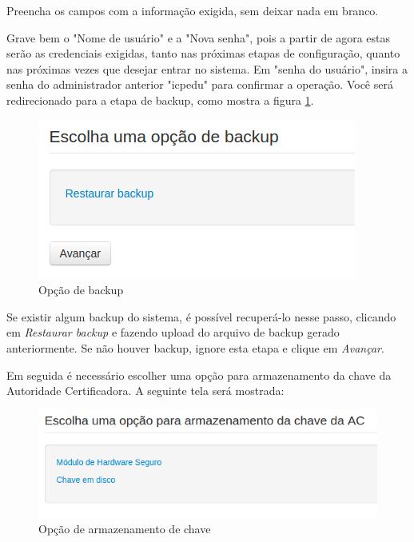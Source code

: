     Preencha os campos com a informação exigida, sem deixar nada em branco. 
    
    Grave bem o "Nome de usuário" e a "Nova senha", pois a partir de agora estas serão as credenciais exigidas, tanto nas próximas etapas de configuração, quanto nas próximas vezes que desejar entrar no sistema. Em "senha do usuário", insira a senha do administrador anterior "icpedu" para confirmar a operação. Você será redirecionado para a etapa de backup, como mostra a figura \ref{fig:opcaobackup}.
    
    \begin{figure}[ht]
     \centering
     \includegraphics[scale=0.6]{images/opcaobackup.png}
     \caption{Opção de backup}
     \label{fig:opcaobackup}
\end{figure}

    Se existir algum backup do sistema, é possível recuperá-lo nesse passo, clicando em \textit{Restaurar backup} e fazendo upload do arquivo de backup gerado anteriormente. Se não houver backup, ignore esta etapa e clique em \textit{Avançar}. 
    
    Em seguida é necessário escolher uma opção para armazenamento da chave da Autoridade Certificadora. A seguinte tela será mostrada:
    
    \begin{figure}[ht]
     \centering
     \includegraphics[scale=0.6]{images/armazenachave.png}
     \caption{Opção de armazenamento de chave}
     \label{fig:armazenachave}
\end{figure}

